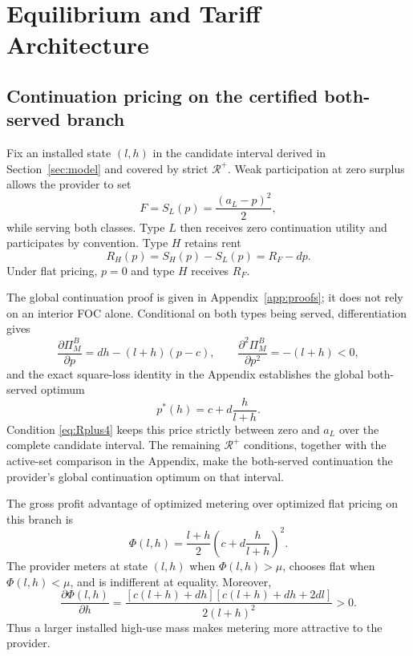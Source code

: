 \section{Equilibrium and Tariff Architecture}\label{sec:equilibrium}

\subsection{Continuation pricing on the certified both-served branch}

Fix an installed state $(l,h)$ in the candidate interval derived in Section~\ref{sec:model} and covered by strict $\mathcal R^+$. Weak participation at zero surplus allows the provider to set
\begin{equation}
 F=S_L(p)=\frac{(a_L-p)^2}{2},
 \label{eq:Fbind}
\end{equation}
while serving both classes. Type $L$ then receives zero continuation utility and participates by convention. Type $H$ retains rent
\begin{equation}
 R_H(p)=S_H(p)-S_L(p)=R_F-dp.
 \label{eq:Hrent}
\end{equation}
Under flat pricing, $p=0$ and type $H$ receives $R_F$.

The global continuation proof is given in Appendix~\ref{app:proofs}; it does not rely on an interior FOC alone. Conditional on both types being served, differentiation gives
\begin{equation}
 \frac{\partial \Pi_M^B}{\partial p}=dh-(l+h)(p-c),
 \qquad
 \frac{\partial^2 \Pi_M^B}{\partial p^2}=-(l+h)<0,
 \label{eq:metered-FOC-SOC}
\end{equation}
and the exact square-loss identity in the Appendix establishes the global both-served optimum
\begin{equation}
 p^*(h)=c+d\frac{h}{l+h}.
 \label{eq:pstar}
\end{equation}
Condition \eqref{eq:Rplus4} keeps this price strictly between zero and $a_L$ over the complete candidate interval. The remaining $\mathcal R^+$ conditions, together with the active-set comparison in the Appendix, make the both-served continuation the provider's global continuation optimum on that interval.

The gross profit advantage of optimized metering over optimized flat pricing on this branch is
\begin{equation}
 \Phi(l,h)
 =\frac{l+h}{2}\left(c+d\frac{h}{l+h}\right)^2.
 \label{eq:Phi}
\end{equation}
The provider meters at state $(l,h)$ when $\Phi(l,h)>\mu$, chooses flat when $\Phi(l,h)<\mu$, and is indifferent at equality. Moreover,
\begin{equation}
 \frac{\partial\Phi(l,h)}{\partial h}
 =\frac{[c(l+h)+dh][c(l+h)+dh+2dl]}{2(l+h)^2}>0.
 \label{eq:Phi-derivative}
\end{equation}
Thus a larger installed high-use mass makes metering more attractive to the provider.

